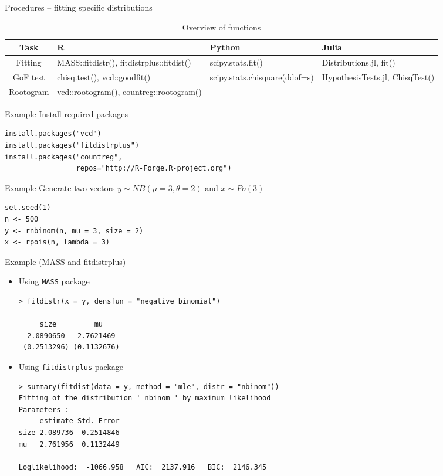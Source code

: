 \documentclass[10pt,ignorenonframetext,aspectratio=169]{beamer}
\begin{document}
\begin{frame}{Procedures -- fitting specific distributions}
    \begin{table}[]
        \centering
        \caption{Overview of functions}
        \begin{tabular}{cp{3.5cm}p{2.5cm}p{2.5cm}}
        \hline
          \textbf{Task}   & \textbf{R} &  \textbf{Python} & \textbf{Julia} \\
        \hline
         Fitting  &
         MASS::fitdistr(), fitdistrplus::fitdist() & scipy.stats.fit() &  Distributions.jl, fit() \\
         GoF test &
          chisq.test(), vcd::goodfit() & scipy.stats.chisquare(ddof=s) & HypothesisTests.jl, ChisqTest()\\
         Rootogram &
          vcd::rootogram(), countreg::rootogram() & -- & -- \\
        \hline
        \end{tabular}
    \end{table}
\end{frame}

\begin{frame}[fragile]{Example} 
Install required packages
\begin{verbatim}
install.packages("vcd")
install.packages("fitdistrplus")
install.packages("countreg", 
                 repos="http://R-Forge.R-project.org")
\end{verbatim}
\end{frame}

\begin{frame}[fragile]{Example}
Generate two vectors $y \sim NB(\mu=3,\theta=2)$ and $x \sim Po(3)$

\begin{verbatim}
set.seed(1)
n <- 500
y <- rnbinom(n, mu = 3, size = 2)
x <- rpois(n, lambda = 3)
\end{verbatim}
\end{frame}

\begin{frame}[fragile]{Example (MASS and fitdistrplus)}
\small
\begin{itemize}
    \item Using \texttt{MASS} package 
    \begin{verbatim}
> fitdistr(x = y, densfun = "negative binomial")

     size         mu    
  2.0890650   2.7621469 
 (0.2513296) (0.1132676)
    \end{verbatim}
    \item Using \texttt{fitdistrplus} package
    \begin{verbatim}
> summary(fitdist(data = y, method = "mle", distr = "nbinom"))
Fitting of the distribution ' nbinom ' by maximum likelihood 
Parameters : 
     estimate Std. Error
size 2.089736  0.2514846
mu   2.761956  0.1132449

Loglikelihood:  -1066.958   AIC:  2137.916   BIC:  2146.345 
      
    \end{verbatim}
\end{itemize}
\end{frame}
\end{document}
